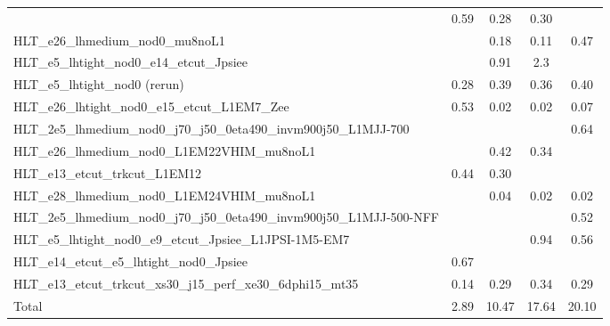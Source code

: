 \begin{table}[!ht]
{\begin{tabular}{p{20cm}cccc}
    &
    0.59&
    0.28&
    0.30 \\
    HLT\_e26\_lhmedium\_nod0\_mu8noL1&
    &
    0.18&
    0.11&
    0.47 \\
    HLT\_e5\_lhtight\_nod0\_e14\_etcut\_Jpsiee&
    &
    0.91&
    2.3&
     \\
    HLT\_e5\_lhtight\_nod0 (rerun)&
    0.28&
    0.39&
    0.36&
    0.40 \\
    HLT\_e26\_lhtight\_nod0\_e15\_etcut\_L1EM7\_Zee&
    0.53&
    0.02&
    0.02&
    0.07 \\
    HLT\_2e5\_lhmedium\_nod0\_j70\_j50\_0eta490\_invm900j50\_L1MJJ-700&
    &
    &
    &
    0.64 \\
    HLT\_e26\_lhmedium\_nod0\_L1EM22VHIM\_mu8noL1&
    &
    0.42&
    0.34&
    \\
    HLT\_e13\_etcut\_trkcut\_L1EM12&
    0.44&
    0.30&
    &
    \\
    HLT\_e28\_lhmedium\_nod0\_L1EM24VHIM\_mu8noL1&
    &
    0.04&
    0.02&
    0.02 \\
    HLT\_2e5\_lhmedium\_nod0\_j70\_j50\_0eta490\_invm900j50\_L1MJJ-500-NFF &
    &
    &
    &
    0.52 \\
    HLT\_e5\_lhtight\_nod0\_e9\_etcut\_Jpsiee\_L1JPSI-1M5-EM7 &
    &
    &
    0.94&
    0.56 \\
    HLT\_e14\_etcut\_e5\_lhtight\_nod0\_Jpsiee &0.67& & & \\
    HLT\_e13\_etcut\_trkcut\_xs30\_j15\_perf\_xe30\_6dphi15\_mt35 &
    0.14& 0.29& 0.34& 0.29 \\
    \hline
    Total& 2.89 & 10.47 & 17.64 & 20.10\\
    \hline
    \hline
    \end{tabular}
    }
    \end{table}
    